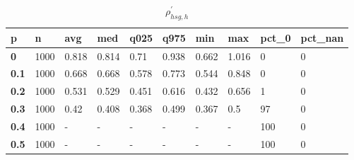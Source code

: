\begin{table}[h]
 \centering 
\footnotesize
\caption{$\rho_{hsg,h}^\prime $}
\label{tab:alphahsgh}
\begin{tabular}[h]{|l|l|l|l|l|l|l|l|l|l|
    } \hline
\textbf{ p} & \textbf{ n} & \textbf{ avg} & \textbf{ med} & \textbf{ q025} & \textbf{ q975} & \textbf{ min} & \textbf{ max} & \textbf{ pct\_0} & \textbf{ pct\_nan}
    \\ \hline
  \textbf{  0} & 1000 & 0.818 & 0.814 &  0.71 & 0.938 & 0.662 & 1.016 &   0 & 0
    \\ \hline
  \textbf{0.1} & 1000 & 0.668 & 0.668 & 0.578 & 0.773 & 0.544 & 0.848 &   0 & 0
    \\ \hline
  \textbf{0.2} & 1000 & 0.531 & 0.529 & 0.451 & 0.616 & 0.432 & 0.656 &   1 & 0
    \\ \hline
  \textbf{0.3} & 1000 &  0.42 & 0.408 & 0.368 & 0.499 & 0.367 &   0.5 &  97 & 0
    \\ \hline
  \textbf{0.4} & 1000 & - & - & - & - & - & - & 100 & 0
    \\ \hline
  \textbf{0.5} & 1000 & - & - & - & - & - & - & 100 & 0
    \\ \hline
 \end{tabular}
 \end{table}
